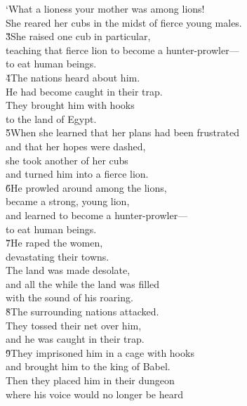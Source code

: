 \begin{poetry}
\poeml `What a lioness your mother was among lions! \\
\poemll    She reared her cubs in the midst of fierce young males. \\
\poeml \v{3}She raised one cub in particular, \\
\poemll    teaching that fierce lion to become a hunter-prowler--- \\
\poemlll       to eat human beings. \\
\poeml \v{4}The nations heard about him. \\
\poemll    He had become caught in their trap. \\
\poeml They brought him with hooks \\
\poemll    to the land of Egypt. \\
\poeml \v{5}When she learned that her plans had been frustrated \\
\poemll    and that her hopes were dashed, \\
\poeml she took another of her cubs \\
\poemll    and turned him into a fierce lion. \\
\poeml \v{6}He prowled around among the lions, \\
\poemll    became a strong, young lion, \\
\poeml and learned to become a hunter-prowler--- \\
\poemll    to eat human beings. \\
\poeml \v{7}He raped the women, \\
\poemll    devastating their towns. \\
\poeml The land was made desolate, \\
\poemll    and all the while the land was filled \\
\poemlll       with the sound of his roaring. \\
\poeml \v{8}The surrounding nations attacked. \\
\poemll    They tossed their net over him, \\
\poemlll       and he was caught in their trap. \\
\poeml \v{9}They imprisoned him in a cage with hooks \\
\poemll    and brought him to the king of Babel. \\
\poeml Then they placed him in their dungeon \\
\poemll    where his voice would no longer be heard \\

\end{poetry}
